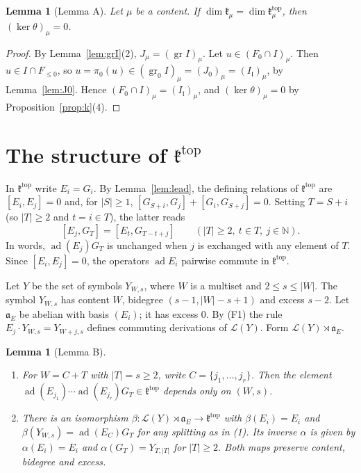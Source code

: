 \documentclass[11pt]{amsart}
\newtheorem{lemma}[theorem]{Lemma}
\theoremstyle{definition}
\theoremstyle{remark}
\newcommand{\N}{\mathbb{N}}
\newcommand{\lie}{\mathfrak{l}}
\newcommand{\kr}{\mathfrak{k}}
\newcommand{\ktop}{\mathfrak{k}^{\mathrm{top}}}
\newcommand{\af}{\mathfrak{a}}
\newcommand{\Lf}{\mathcal{L}}
\newcommand{\ad}{\operatorname{ad}}
\begin{document}
\begin{lemma}[Lemma A]\label{lem:A}
Let $\mu$ be a content. If $\dim\kr_\mu=\dim\ktop_\mu$, then $(\ker\theta)_\mu=0$.
\end{lemma}

\begin{proof}
By Lemma~\ref{lem:grI}(2), $J_\mu=(\operatorname{gr}I)_\mu$. Let $u\in(F_0\cap I)_\mu$. Then $u\in I\cap F_{\le0}$, so $u=\pi_0(u)\in(\operatorname{gr}_0I)_\mu=(J_0)_\mu=(I_{\lie})_\mu$, by Lemma~\ref{lem:J0}. Hence $(F_0\cap I)_\mu=(I_{\lie})_\mu$, and $(\ker\theta)_\mu=0$ by Proposition~\ref{prop:k}(4).
\end{proof}

\section{The structure of \texorpdfstring{$\ktop$}{k-top}}\label{sec:ktop}

In $\ktop$ write $E_i=G_i$. By Lemma~\ref{lem:lead}, the defining relations of $\ktop$ are $[E_i,E_j]=0$ and, for $|S|\ge1$, $[G_{S+i},G_j]+[G_i,G_{S+j}]=0$. Setting $T=S+i$ (so $|T|\ge2$ and $t=i\in T$), the latter reads
\begin{equation}\label{eq:exchange}
[E_j,G_T]=[E_t,G_{T-t+j}]\qquad(|T|\ge2,\ t\in T,\ j\in\N).
\end{equation}
In words, $\ad(E_j)G_T$ is unchanged when $j$ is exchanged with any element of $T$. Since $[E_i,E_j]=0$, the operators $\ad E_i$ pairwise commute in $\ktop$.

Let $Y$ be the set of symbols $Y_{W,s}$, where $W$ is a multiset and $2\le s\le|W|$. The symbol $Y_{W,s}$ has content $W$, bidegree $(s-1,|W|-s+1)$ and excess $s-2$. Let $\af_E$ be abelian with basis $(E_i)$; it has excess $0$. By (F1) the rule $E_j\cdot Y_{W,s}=Y_{W+j,s}$ defines commuting derivations of $\Lf(Y)$. Form $\Lf(Y)\rtimes\af_E$.

\begin{lemma}[Lemma B]\label{lem:B}
\begin{enumerate}
\item For $W=C+T$ with $|T|=s\ge2$, write $C=\{j_1,\dots,j_r\}$. Then the element $\ad(E_{j_1})\cdots\ad(E_{j_r})G_T\in\ktop$ depends only on $(W,s)$.
\item There is an isomorphism $\beta\colon\Lf(Y)\rtimes\af_E\to\ktop$ with $\beta(E_i)=E_i$ and $\beta(Y_{W,s})=\ad(E_{C})G_T$ for any splitting as in (1). Its inverse $\alpha$ is given by $\alpha(E_i)=E_i$ and $\alpha(G_T)=Y_{T,|T|}$ for $|T|\ge2$. Both maps preserve content, bidegree and excess.
\end{enumerate}
\end{lemma}
\end{document}
